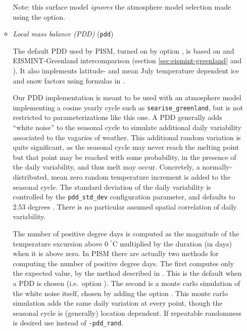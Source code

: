 \begin{enumerate}
\begin{itemize}
    Note: this surface model \emph{ignores}  the atmosphere model selection made using the  option.

  \item \emph{Local mass balance (PDD)} (\texttt{pdd})    

   The default PDD used by PISM, turned on by option , is based on \cite{CalovGreve05} and EISMINT-Greenland intercomparison (section \ref{sec:eismint-greenland} and \cite{RitzEISMINT}). It also implements latitude- and mean July temperature dependent ice and snow factors using formulas in \cite{Faustoetal2009}.

   Our PDD implementation is meant to be used with an atmosphere model implementing a cosine yearly cycle such as \texttt{searise_greenland}, but is not restricted to parameterizations like this one. A PDD generally adds ``white noise'' to the seasonal cycle to simulate additional daily variability associated to the vagaries of weather.  This additional random variation is quite significant, as the seasonal cycle may never reach the melting point but that point may be reached with some probability, in the presence of the daily variability, and thus melt may occur.  Concretely, a normally-distributed, mean zero random temperature increment is added to the seasonal cycle.  The standard deviation of the daily variability is controlled by the \texttt{pdd_std_dev} configuration parameter, and defaults to 2.53 degrees \cite{Faustoetal2009}. There is no particular assumed spatial correlation of daily variability.

The number of positive degree days is computed as the magnitude of the temperature excursion above $0\!\phantom{|}^\circ \text{C}$ multiplied by the duration (in days) when it is above zero.  In PISM there are actually two methods for computing the number of positive degree days.  The first computes only the expected value, by the method described in \cite{CalovGreve05}.  This is the default when a PDD is chosen (i.e.~option ).  The second is a monte carlo simulation of the white noise itself, chosen by adding the option .  This monte carlo simulation adds the same daily variation at every point, though the seasonal cycle is (generally) location dependent.  If repeatable randomness is desired use  instead of \texttt{-pdd_rand}.


\end{itemize}
\end{enumerate}
